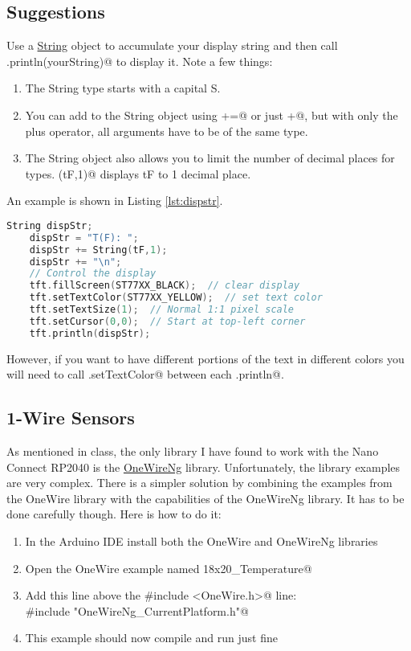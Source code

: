 \subsection{Suggestions}
Use a \href{https://www.arduino.cc/reference/en/language/variables/data-types/stringobject/}{String} 
object to accumulate your display string and then call \lstinline@display.println(yourString)@ 
to display it. Note a few things:
\begin{enumerate}
	\item The String type starts with a capital S.
	\item You can add to the String object using \lstinline@+=@ or just \lstinline@+@, 
		but with only the plus operator, all arguments have to be of the same type. 
	\item The String object also allows you to limit the number of decimal places for \lstinline@float@ types.
            \lstinline@String(tF,1)@ displays tF to 1 decimal place.
\end{enumerate}
An example is shown in Listing \ref{lst:dispstr}.
\begin{lstlisting}[caption={This is an example of using a String 
		object to display text and float variables. The floats are 
		limited to 1 decimal place such that 7.123 would be displayed as 7.1.},
		label={lst:dispstr},language=C++]
	String dispStr;
	dispStr = "T(F): ";
	dispStr += String(tF,1);
	dispStr += "\n";
	// Control the display  
	tft.fillScreen(ST77XX_BLACK);  // clear display
	tft.setTextColor(ST77XX_YELLOW);  // set text color
	tft.setTextSize(1);  // Normal 1:1 pixel scale
	tft.setCursor(0,0);  // Start at top-left corner
	tft.println(dispStr);
\end{lstlisting}
However, if you want to have different portions of the text in different colors you will
need to call \lstinline@tft.setTextColor@ between each \lstinline@tft.println@.

\subsection{1-Wire Sensors}
As mentioned in class, the only library I have found to work with the Nano Connect 
RP2040 is the \href{https://github.com/pstolarz/OneWireNg}{OneWireNg} library. 
Unfortunately, the library examples are very complex. There is a simpler solution by 
combining the examples from the OneWire library with the capabilities of the OneWireNg 
library. It has to be done carefully though. Here is how to do it:
\begin{enumerate}
    \item In the Arduino IDE install both the OneWire and OneWireNg libraries
    \item Open the OneWire example named \lstinline@DS18x20_Temperature@ 
    \item Add this line above the \lstinline@#include <OneWire.h>@ line:\\
            \lstinline@#include "OneWireNg_CurrentPlatform.h"@ 
    \item This example should now compile and run just fine 
\end{enumerate}

